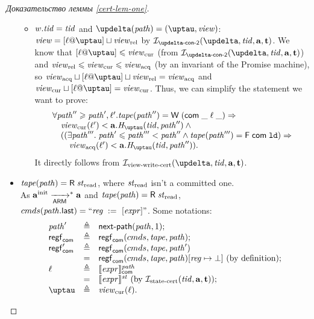 \begin{proof}[Доказательство леммы \ref{cert-lem-one}]
\begin{itemize}
\begin{itemize}
        \item $w.\mathit{tid} = \mathit{tid}$ and $\delta(\cpath) = (\tau, \R)$: \\
          $\R = [\loc @ \tau] \sqcup \Rrel$ by $\invDeltaDefTwo(\delta, \tId, \aT, \tT)$.
          We know that $[\loc @ \tau] \le \Rcur$ (from $\invDeltaDefTwo(\delta, \tId, \aT, \tT)$) and $\mathit{view}_{\mathrm{rel}} \leqslant \mathit{view}_{\mathrm{cur}} \leqslant \mathit{view}_{\mathrm{acq}}$
          (by an invariant of the Promise machine), so $\Racq \sqcup [\loc @ \tau] \sqcup \Rrel = \Racq$ and
          $\Rcur \sqcup [\loc @ \tau] = \Rcur$.
          Thus, we can simplify the statement we want to prove:
      \[\begin{array}{l}
        \forall \cpath'' \ge \cpath', \loc'. \tape(\cpath'') = \tapeWrite{(\tapeWriteCommitted{\_}{\loc}{\_})} \Rightarrow \\
        \quad \Rcur(\loc') < \aT.\tmap(\tId, \cpath'') \land {} \\
        \quad ((\exists \cpath'''. \; \cpath' \le \cpath''' < \cpath'' \land 
             \tape(\cpath''') = \tapeFence{\Committed}{\LD}) \Rightarrow \\
        \quad \quad \Racq(\loc') < \aT.\tmap(\tId, \cpath'')).\\
      \end{array}\]
      It directly follows from $\invViewWriteCERT(\delta, \tId, \aT, \tT)$.

      \end{itemize}
      
    \item $\tape(\cpath) = \tapeRead{\Rstate}$, where $\mathit{st}_{\textup{\rm read}}$ isn't a committed one. \\
      As $\mathbf{a}^{\rm init} \xrightarrow[\mathsf{ARM}]{}^{*} \mathbf{a}$ and $\tape(\cpath) = \tapeRead{\Rstate}$,
      ${cmds}(\mathit{path}.\textup{\sf last}) = ``\mathit{reg} \;:=_{}\;[\mathit{expr}]"$.
      Some notations:
      \[\begin{array}{l l l}
        \cpath'    & \triangleq & \nextPath{\cpath}{1}; \\
        \regstcom  & \triangleq & \regstcom(\Cprom, \tape, \cpath); \\
        \regstcom' & \triangleq & \regstcom(\Cprom, \tape, \cpath') \\
                   & =          & \regstcom(\Cprom, \tape, \cpath)[\reg \mapsto \bot] \text{ (by definition)}; \\
        \loc       & \triangleq & \semfcom{\expr}{\cpath} \\
                   & =          & \semf{\expr}{\PromState} \text{ (by $\invStateCERT(\tId, \aT, \tT)$)}; \\
        \tau       & \triangleq & \Rcur(\loc). \\
      \end{array}\]


\end{itemize}
\end{proof}
